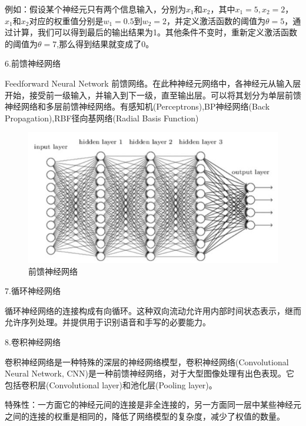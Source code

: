 \documentclass[openbib]{article}
\begin{document}
	例如：假设某个神经元只有两个信息输入，分别为$x_1$和$x_2$，其中$x_1=5, x_2=2$，$x_1$和$x_2$对应的权重值分别是$w_1=0.5$到$w_2=2$，并定义激活函数的阈值为$\theta=5$，通过计算，我们可以得到最后的输出结果为1。其他条件不变时，重新定义激活函数的阈值为$\theta=7$,那么得到结果就变成了0。

	
	\begin{center}
		6.前馈神经网络
	\end{center}
	
	Feedforward Neural Network 前馈网络。在此种神经元网络中，各神经元从输入层开始，接受前一级输入，并输入到下一级，直至输出层。可以将其划分为单层前馈神经网络和多层前馈神经网络。有感知机(Perceptrons),BP神经网络(Back Propagation),RBF径向基网络(Radial Basis Function)
	
	\begin{figure}[htbp]
		\centering
		\includegraphics[scale=0.5]{前馈神经网络.jpg}
		\caption{前馈神经网络}
	\end{figure}
	
	\begin{center}
		7.循环神经网络
	\end{center}
	
	循环神经网络的连接构成有向循环。这种双向流动允许用内部时间状态表示，继而允许序列处理。并提供用于识别语音和手写的必要能力。
	
	\begin{center}
		8.卷积神经网络
	\end{center}
	
	卷积神经网络是一种特殊的深层的神经网络模型，卷积神经网络(Convolutional Neural Network, CNN)是一种前馈神经网络，对于大型图像处理有出色表现。它包括卷积层(Convolutional layer)和池化层(Pooling layer)。
	
	特殊性：一方面它的神经元间的连接是非全连接的，另一方面同一层中某些神经元之间的连接的权重是相同的，降低了网络模型的复杂度，减少了权值的数量。
	
\end{document}
